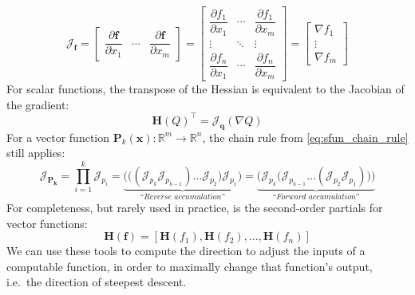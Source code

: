 \documentclass[12pt,initial,twoside,maitrise]{dms}
\numberwithin{equation}{section}
\numberwithin{table}{chapter}
\numberwithin{figure}{chapter}
\begin{document}
%
\begin{equation}
\mathcal{J}_{\mathbf{f}} =
\begin{bmatrix}
    \dfrac{\partial \mathbf{f}}{\partial x_1} & \cdots & \dfrac{\partial \mathbf{f}}{\partial x_m}
\end{bmatrix} =
\begin{bmatrix}
    \dfrac{\partial f_1}{\partial x_1} & \cdots & \dfrac{\partial f_1}{\partial x_m}\\
    \vdots & \ddots & \vdots\\
    \dfrac{\partial f_n}{\partial x_1} & \cdots & \dfrac{\partial f_n}{\partial x_m}
\end{bmatrix} =
\begin{bmatrix}
    \nabla f_1 \\
    \vdots \\
    \nabla f_m
\end{bmatrix}
\end{equation}
%
For scalar functions, the transpose of the Hessian is equivalent to the Jacobian of the gradient:
%
\begin{equation}
\mathbf{H}(Q)^\intercal = \mathcal{J}_\mathbf{q}(\nabla Q)
\end{equation}
%
For a vector function $\mathbf{P}_k(\mathbf{x}): \mathbb{R}^m\rightarrow\mathbb{R}^n$, the chain rule from \autoref{eq:sfun_chain_rule} still applies:
%
\begin{equation} \label{eq:vfun_chain_rule}
\mathcal{J}_\mathbf{P_k} = \displaystyle \prod_{i=1}^{k} \mathcal{J}_{p_i} = \underbrace{\bigg(\Big((\mathcal{J}_{p_k} \mathcal{J}_{p_{k-1}}) \dots \mathcal{J}_{p_2}\Big) \mathcal{J}_{p_1}\bigg)}_{\textit{``Reverse accumulation''}} = \underbrace{\bigg(\mathcal{J}_{p_k} \Big(\mathcal{J}_{p_{k-1}} \dots (\mathcal{J}_{p_2} \mathcal{J}_{p_1})\Big)\bigg)}_{\textit{``Forward accumulation''}}
\end{equation}
%
For completeness, but rarely used in practice, is the second-order partials for vector functions:
%
\begin{equation}
\mathbf{H} (\mathbf {f} )=[\mathbf {H} (f_{1}), \mathbf {H} (f_{2}), \dots, \mathbf {H} (f_{n})]
\end{equation}
%
We can use these tools to compute the direction to adjust the inputs of a computable function, in order to maximally change that function's output, i.e.\ the direction of steepest descent.
\end{document}

